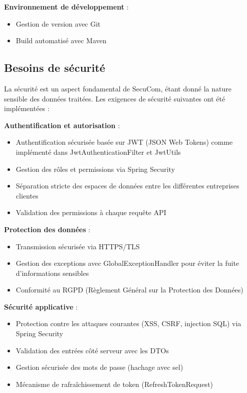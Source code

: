 \textbf{Environnement de développement} :
\begin{itemize}
  \item Gestion de version avec Git
  \item Build automatisé avec Maven
\end{itemize}

\subsection{Besoins de sécurité}

La sécurité est un aspect fondamental de SecuCom, étant donné la nature sensible des données traitées. Les exigences de sécurité suivantes ont été implémentées :

\textbf{Authentification et autorisation} :
\begin{itemize}
  \item Authentification sécurisée basée sur JWT (JSON Web Tokens) comme implémenté dans JwtAuthenticationFilter et JwtUtils
  \item Gestion des rôles et permissions via Spring Security
  \item Séparation stricte des espaces de données entre les différentes entreprises clientes
  \item Validation des permissions à chaque requête API
\end{itemize}

\textbf{Protection des données} :
\begin{itemize}
  \item Transmission sécurisée via HTTPS/TLS
  \item Gestion des exceptions avec GlobalExceptionHandler pour éviter la fuite d'informations sensibles
  \item Conformité au RGPD (Règlement Général sur la Protection des Données)
\end{itemize}

\textbf{Sécurité applicative} :
\begin{itemize}
  \item Protection contre les attaques courantes (XSS, CSRF, injection SQL) via Spring Security
  \item Validation des entrées côté serveur avec les DTOs
  \item Gestion sécurisée des mots de passe (hachage avec sel)
  \item Mécanisme de rafraîchissement de token (RefreshTokenRequest)
\end{itemize}

